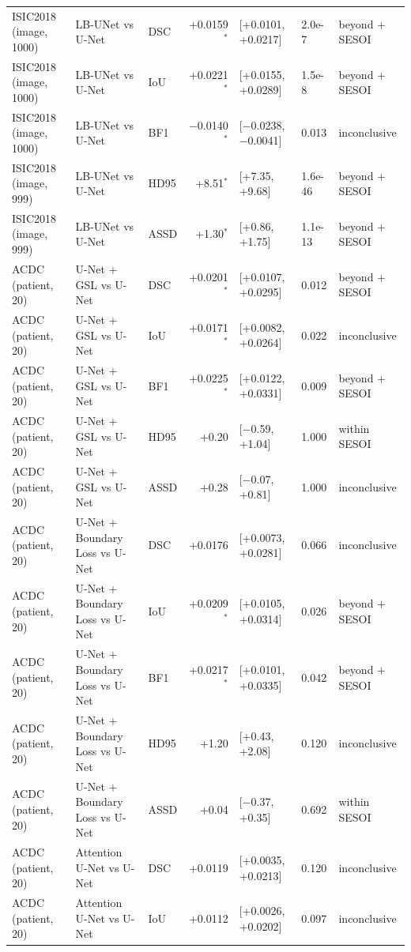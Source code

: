 \begin{tabular}{lllrlll}
ISIC2018 (image, 1000) & LB-UNet vs U-Net & DSC & +0.0159$^{*}$ & [+0.0101, +0.0217] & 2.0e-7 & beyond $+$SESOI \\
ISIC2018 (image, 1000) & LB-UNet vs U-Net & IoU & +0.0221$^{*}$ & [+0.0155, +0.0289] & 1.5e-8 & beyond $+$SESOI \\
ISIC2018 (image, 1000) & LB-UNet vs U-Net & BF1 & $-$0.0140$^{*}$ & [$-$0.0238, $-$0.0041] & 0.013 & inconclusive \\
ISIC2018 (image, 999) & LB-UNet vs U-Net & HD95 & +8.51$^{*}$ & [+7.35, +9.68] & 1.6e-46 & beyond $+$SESOI \\
ISIC2018 (image, 999) & LB-UNet vs U-Net & ASSD & +1.30$^{*}$ & [+0.86, +1.75] & 1.1e-13 & beyond $+$SESOI \\
\midrule
ACDC (patient, 20) & U-Net + GSL vs U-Net & DSC & +0.0201$^{*}$ & [+0.0107, +0.0295] & 0.012 & beyond $+$SESOI \\
ACDC (patient, 20) & U-Net + GSL vs U-Net & IoU & +0.0171$^{*}$ & [+0.0082, +0.0264] & 0.022 & inconclusive \\
ACDC (patient, 20) & U-Net + GSL vs U-Net & BF1 & +0.0225$^{*}$ & [+0.0122, +0.0331] & 0.009 & beyond $+$SESOI \\
ACDC (patient, 20) & U-Net + GSL vs U-Net & HD95 & +0.20 & [$-$0.59, +1.04] & 1.000 & within SESOI \\
ACDC (patient, 20) & U-Net + GSL vs U-Net & ASSD & +0.28 & [$-$0.07, +0.81] & 1.000 & inconclusive \\
ACDC (patient, 20) & U-Net + Boundary Loss vs U-Net & DSC & +0.0176 & [+0.0073, +0.0281] & 0.066 & inconclusive \\
ACDC (patient, 20) & U-Net + Boundary Loss vs U-Net & IoU & +0.0209$^{*}$ & [+0.0105, +0.0314] & 0.026 & beyond $+$SESOI \\
ACDC (patient, 20) & U-Net + Boundary Loss vs U-Net & BF1 & +0.0217$^{*}$ & [+0.0101, +0.0335] & 0.042 & beyond $+$SESOI \\
ACDC (patient, 20) & U-Net + Boundary Loss vs U-Net & HD95 & +1.20 & [+0.43, +2.08] & 0.120 & inconclusive \\
ACDC (patient, 20) & U-Net + Boundary Loss vs U-Net & ASSD & +0.04 & [$-$0.37, +0.35] & 0.692 & within SESOI \\
ACDC (patient, 20) & Attention U-Net vs U-Net & DSC & +0.0119 & [+0.0035, +0.0213] & 0.120 & inconclusive \\
ACDC (patient, 20) & Attention U-Net vs U-Net & IoU & +0.0112 & [+0.0026, +0.0202] & 0.097 & inconclusive \\

\end{tabular}
